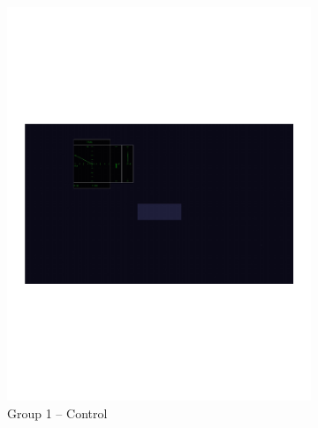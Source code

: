 \documentclass[]{aiaa-tc}%
\begin{document}
\begin{figure}[tb!]
  \centering
  \begin{subfigure}{.5\textwidth}
    \centering
    \includegraphics[width=.99\linewidth, page=1]{figs/guidance_full.pdf}
    \caption{Group 1 -- Control}
    \label{fig:sub1}
  \end{subfigure}%
  \begin{subfigure}{.5\textwidth}
    \centering

\end{subfigure}
\end{figure}
\end{document}
